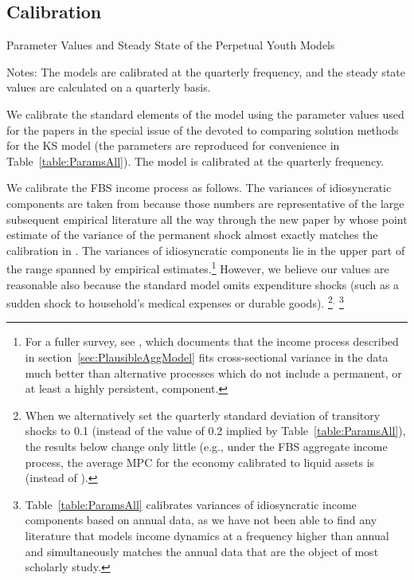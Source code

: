 \documentclass[12pt,titlepage]{econtex}
\newcommand{\tablenotessize}[1]{\footnotesize{#1}} %
\begin{document}
\subsection{Calibration}

\begin{table}
\caption{Parameter Values and Steady State of the Perpetual Youth Models}
\label{table:ParamsAll}
\begin{minipage}{\textwidth}

\tablenotessize{Notes: The models are calibrated at the quarterly frequency, and the steady state values are calculated on a quarterly basis.}
\end{minipage}
\end{table}


We calibrate the standard elements of the model using the parameter
values used for the papers in the special issue of the \citet{jedc_ksVolume}
devoted to comparing solution methods for the KS model (the parameters
are reproduced for convenience in
Table~\ref{table:ParamsAll}).  The model is calibrated at the quarterly frequency.

We calibrate the FBS income process as follows.  The variances of
idiosyncratic components are taken from \citet{carroll:brookings}
because those numbers are representative of the large subsequent empirical literature
all the way through the new paper by \cite{dhprvInequality} whose point estimate of the
variance of the permanent shock almost exactly matches the calibration in
\cite{carroll:brookings}. The variances of idiosyncratic components lie in the upper part of the range spanned by empirical estimates.\footnote{For a fuller survey, see \citet{cstKS}, which documents that the income
process described in section~\ref{sec:PlausibleAggModel} fits
cross-sectional variance in the data much better than alternative
processes which do not include a permanent, or at least a highly persistent, component.} However, we believe our values are reasonable also because the standard model omits expenditure shocks (such as a sudden shock to household's medical expenses or durable goods).%
\footnote{When we alternatively set the quarterly standard deviation of transitory shocks to 0.1 (instead of the value of 0.2 implied by Table~\ref{table:ParamsAll}), the results below change only little (e.g., under the FBS aggregate income process, the average MPC for the economy calibrated to liquid assets is
$
 $
(instead of
$

$).}${}^{, }$
\footnote{Table~\ref{table:ParamsAll} calibrates variances of idiosyncratic income components based on annual data, as we have not been able to find any literature that models income
dynamics at a frequency higher than annual and simultaneously matches
the annual data that are the object of most scholarly study.
}
\end{document}
